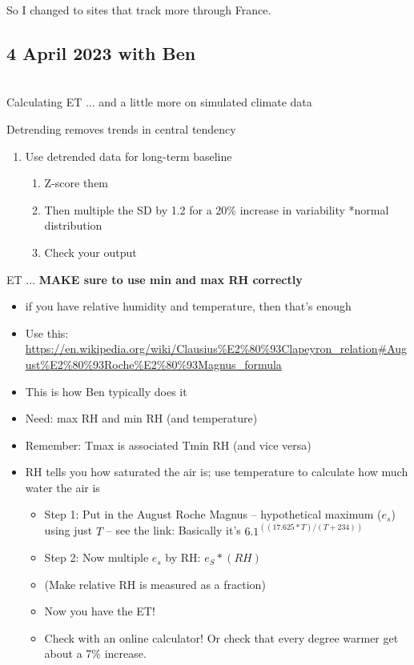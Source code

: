\documentclass[11pt,letter]{article}
\begin{document}
So I changed to sites that track more through France. \\


\subsection{4 April 2023 with Ben}\\

Calculating ET ... and a little more on simulated climate data 

Detrending removes trends in central tendency 
\begin{enumerate}
\item Use detrended data for long-term baseline
\begin{enumerate}
\item Z-score them
\item Then multiple the SD by 1.2 for a 20\% increase in variability *normal distribution 
\item Check your output 
\end{enumerate}
\end{enumerate}

ET ... {\bf MAKE sure to use min and max RH correctly}
\begin{itemize}
	\item if you have relative humidity and temperature, then that's enough 
	\item Use this: \url{https://en.wikipedia.org/wiki/Clausius%E2%80%93Clapeyron_relation#August%E2%80%93Roche%E2%80%93Magnus_formula}
	\item This is how Ben typically does it
	\item Need: max RH and min RH (and temperature)
	\item Remember: Tmax is associated Tmin RH (and vice versa)
	\item RH tells you how saturated the air is; use temperature to calculate how much water the air is
	\begin{itemize}
	\item Step 1: Put in the August Roche Magnus -- hypothetical maximum ($e_s$) using just $T$ -- see the link: Basically it's $6.1 ^{((17.625*T)/(T+234))}$
\item Step 2: Now multiple $e_s$ by RH: $e_S*(RH)$
\item (Make relative RH is measured as a fraction)
\item Now you have the ET!
\item Check with an online calculator! Or check that every degree warmer get about a 7\% increase. 
	\end{itemize}
	\end{itemize}
\end{document}
